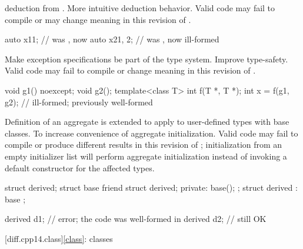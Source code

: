 \change
{} deduction from .
\rationale
More intuitive deduction behavior.
\effect
Valid \CppXIV{} code may fail to compile or may change meaning
in this revision of \Cpp{}.
\begin{example}
\begin{codeblock}
auto x1{1};         // was , now 
auto x2{1, 2};      // was , now ill-formed
\end{codeblock}
\end{example}

\change
Make exception specifications be part of the type system.
\rationale
Improve type-safety.
\effect
Valid \CppXIV{} code may fail to compile or change meaning in this
revision of \Cpp{}.
\begin{example}
\begin{codeblock}
void g1() noexcept;
void g2();
template<class T> int f(T *, T *);
int x = f(g1, g2);              // ill-formed; previously well-formed
\end{codeblock}
\end{example}

\change
Definition of an aggregate is extended
to apply to user-defined types with base classes.
\rationale
To increase convenience of aggregate initialization.
\effect
Valid \CppXIV{} code may fail to compile or produce different results in this
revision of \Cpp{}; initialization from an empty initializer list will
perform aggregate initialization instead of invoking a default constructor
for the affected types.
\begin{example}
\begin{codeblock}
struct derived;
struct base {
  friend struct derived;
private:
  base();
};
struct derived : base {};

derived d1{};       // error; the code was well-formed in \CppXIV{}
derived d2;         // still OK
\end{codeblock}
\end{example}

[diff.cpp14.class]{\ref{class}: classes}

